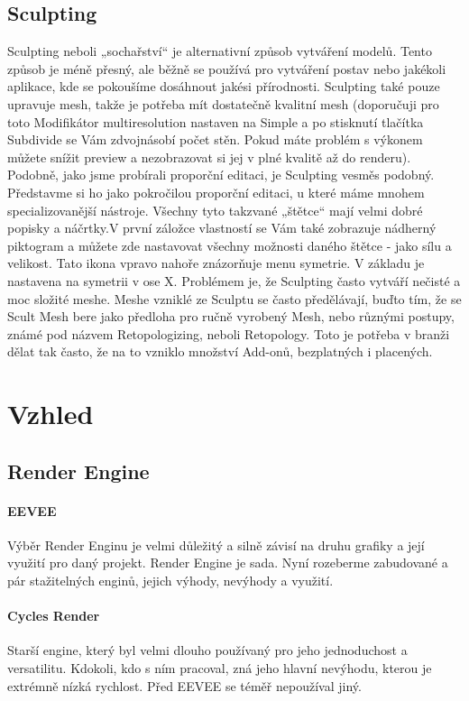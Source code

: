 \documentclass[12pt,a4paper]{report}
\begin{document}
	\subsection{Sculpting}
	Sculpting neboli „sochařství“ je alternativní způsob vytváření modelů.
	Tento způsob je méně přesný, ale běžně se používá pro vytváření postav
	nebo jakékoli aplikace, kde se pokoušíme dosáhnout jakési přírodnosti.
	Sculpting také pouze upravuje mesh, takže je potřeba mít dostatečně
	kvalitní mesh (doporučuji pro toto Modifikátor multiresolution nastaven na
	Simple a po stisknutí tlačítka Subdivide se Vám zdvojnásobí počet stěn.
	Pokud máte problém s výkonem můžete snížit preview a nezobrazovat si
	jej v plné kvalitě až do renderu). Podobně, jako jsme probírali proporční
	editaci, je Sculpting vesměs podobný. Představme si ho jako pokročilou
	proporční editaci, u které máme mnohem specializovanější nástroje.
	Všechny tyto takzvané „štětce“ mají velmi dobré popisky a náčrtky.V první záložce vlastností se Vám také zobrazuje nádherný piktogram a
	můžete zde nastavovat všechny možnosti daného štětce - jako sílu a
	velikost.
	Tato ikona vpravo nahoře znázorňuje menu symetrie. V
	základu je nastavena na symetrii v ose X.
	Problémem je, že Sculpting často vytváří nečisté a moc složité meshe.
	Meshe vzniklé ze Sculptu se často předělávají, buďto tím, že se Scult
	Mesh bere jako předloha pro ručně vyrobený Mesh, nebo různými
	postupy, známé pod názvem Retopologizing, neboli Retopology. Toto je
	potřeba v branži dělat tak často, že na to vzniklo množství Add-onů,
	bezplatných i placených.
	
	
	\section{Vzhled}
	\subsection{Render Engine}
	\paragraph{EEVEE}
	Výběr Render Enginu je velmi důležitý a silně závisí na druhu grafiky a její
	využití pro daný projekt. Render Engine je sada. Nyní rozeberme
	zabudované a pár stažitelných enginů, jejich výhody, nevýhody a využití.
	\paragraph{Cycles Render}
	Starší engine, který byl velmi dlouho používaný pro jeho jednoduchost
	a versatilitu. Kdokoli, kdo s ním pracoval, zná jeho hlavní nevýhodu,
	kterou je extrémně nízká rychlost. Před EEVEE se téměř nepoužíval jiný.
	
\end{document}
